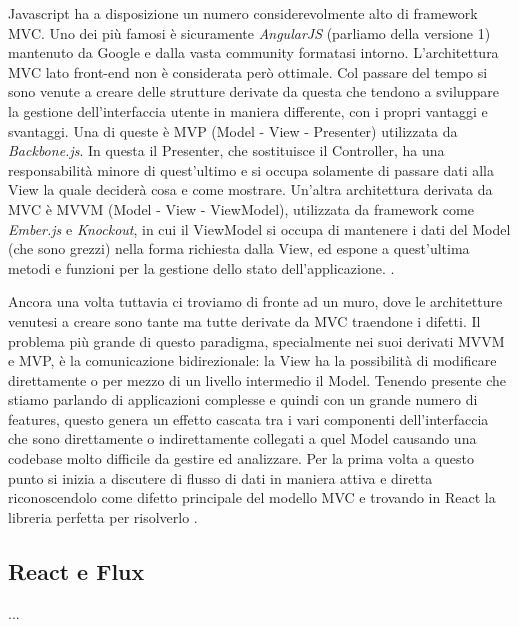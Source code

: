 Javascript ha a disposizione un numero considerevolmente alto di framework MVC. Uno dei più famosi è sicuramente \textit{AngularJS} (parliamo della versione 1) mantenuto da Google e dalla vasta community formatasi intorno.
L'architettura MVC lato front-end non è considerata però ottimale. Col passare del tempo si sono venute a creare delle strutture derivate da questa che tendono a sviluppare la gestione dell'interfaccia utente in maniera differente, con i propri vantaggi e svantaggi. Una di queste è MVP (Model - View - Presenter) utilizzata da \textit{Backbone.js}. In questa il Presenter, che sostituisce il Controller, ha una responsabilità minore di quest'ultimo e si occupa solamente di passare dati alla View la quale deciderà cosa e come mostrare. Un'altra architettura derivata da MVC è MVVM (Model - View - ViewModel), utilizzata da framework come \textit{Ember.js} e \textit{Knockout}, in cui il ViewModel si occupa di mantenere i dati del Model (che sono grezzi) nella forma richiesta dalla View, ed espone a quest'ultima metodi e funzioni per la gestione dello stato dell'applicazione. \cite{ChauhanFrontendArchitectures}.

Ancora una volta tuttavia ci troviamo di fronte ad un muro, dove le architetture venutesi a creare sono tante ma tutte derivate da MVC traendone i difetti. Il problema più grande di questo paradigma, specialmente nei suoi derivati MVVM e MVP, è la comunicazione bidirezionale: la View ha la possibilità di modificare direttamente o per mezzo di un livello intermedio il Model. Tenendo presente che stiamo parlando di applicazioni complesse e quindi con un grande numero di features, questo genera un effetto cascata tra i vari componenti dell'interfaccia che sono direttamente o indirettamente collegati a quel Model causando una codebase molto difficile da gestire ed analizzare. Per la prima volta a questo punto si inizia a discutere di flusso di dati in maniera attiva e diretta riconoscendolo come difetto principale del modello MVC e trovando in React la libreria perfetta per risolverlo \cite{SalihefendicFluxVsMVC}.

\subsection{React e Flux}
...
